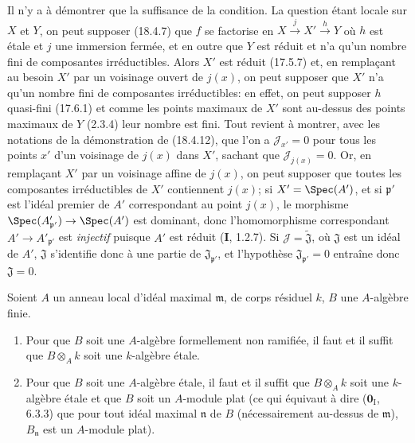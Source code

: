 Il n'y a à démontrer que la suffisance de la condition. La question étant locale sur $X$ et $Y$, on peut supposer (18.4.7) que $f$ se factorise en $X\xrightarrow{j}X'\xrightarrow{h}Y$ où $h$ est étale et $j$ une immersion fermée, et en outre que $Y$ est réduit et n'a qu'un nombre fini de composantes irréductibles. Alors $X'$ est réduit (17.5.7) et, en remplaçant au besoin $X'$ par un voisinage ouvert de $j(x)$, on peut supposer que $X'$ n'a qu'un nombre fini de composantes irréductibles: en effet, on peut supposer $h$ quasi-fini (17.6.1) et comme les points maximaux de $X'$ sont au-dessus des points maximaux de $Y$ (2.3.4) leur nombre est fini. Tout revient à montrer, avec les notations de la démonstration de (18.4.12), que l'on a $\mathscr J_{x'}=0$ pour tous les points $x'$ d'un voisinage de $j(x)$ dans $X'$, sachant que $\mathscr J_{j(x)}=0$. Or, en remplaçant $X'$ par un voisinage affine de $j(x)$, on peut supposer que toutes les composantes irréductibles de $X'$ contiennent $j(x)$; si $X'=\Spec(A')$, et si $\mathfrak p'$ est l'idéal premier de $A'$ correspondant au point $j(x)$, le morphisme $\Spec(A'_{\mathfrak p'})\to\Spec(A')$ est dominant, donc l'homomorphisme correspondant $A'\to A'_{\mathfrak p'}$ est \emph{injectif} puisque $A'$ est réduit (\textbf{I}, 1.2.7). Si $\mathscr J=\widetilde{\mathfrak J}$, où $\mathfrak J$ est un idéal de $A'$, $\mathfrak J$ s'identifie donc à une partie de $\mathfrak J_{\mathfrak p'}$, et l'hypothèse $\mathfrak J_{\mathfrak p'}=0$ entraîne donc $\mathfrak J=0$.

\begin{corollary}[18.4.14]
\label{IV.18.4.14}
Soient $A$ un anneau local d'idéal maximal $\mathfrak m$, de corps résiduel $k$, $B$ une $A$-algèbre finie.


\begin{enumerate}
  \item[\textup{(i)}] Pour que $B$ soit une $A$-algèbre formellement non ramifiée, il faut et il suffit que $B\otimes_A k$ soit une $k$-algèbre étale.
  \item[\textup{(ii)}] Pour que $B$ soit une $A$-algèbre étale, il faut et il suffit que $B\otimes_A k$ soit une $k$-algèbre étale et que $B$ soit un $A$-module plat \textup{(ce qui équivaut à dire ($\mathbf{0}_{\mathrm I}$, 6.3.3) que pour tout idéal maximal $\mathfrak n$ de $B$ (nécessairement au-dessus de $\mathfrak m$), $B_{\mathfrak n}$ est un $A$-module plat).}
\end{enumerate}
\end{corollary}

